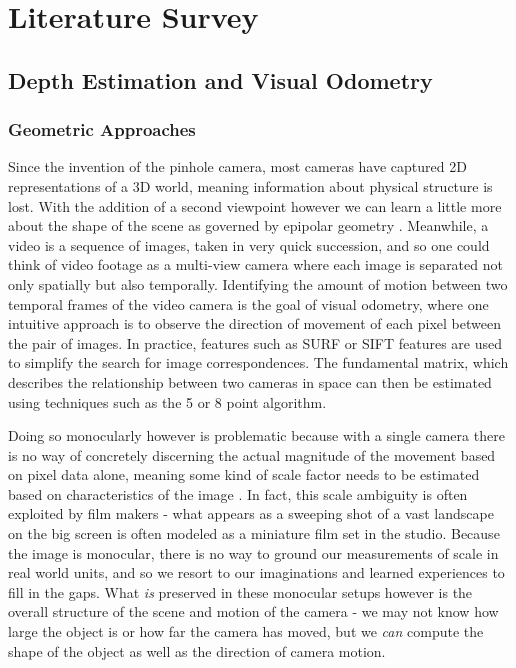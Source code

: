 \documentclass[openany]{book}
\begin{document}
\chapter{Literature Survey}


\section{Depth Estimation and Visual Odometry}


\subsection{Geometric Approaches}

Since the invention of the pinhole camera, most cameras have captured 2D representations of a 3D world, meaning information about physical structure is lost. With the addition of a second viewpoint however we can learn a little more about the shape of the scene as governed by epipolar geometry \cite{zisserman2004multiview}. Meanwhile, a video is a sequence of images, taken in very quick succession, and so one could think of video footage as a multi-view camera where each image is separated not only spatially but also temporally. Identifying the amount of motion between two temporal frames of the video camera is the goal of visual odometry, where one intuitive approach is to observe the direction of movement of each pixel between the pair of images. In practice, features such as SURF \cite{bay2008surf} or SIFT \cite{lowe2004sift} features are used to simplify the search for image correspondences. The fundamental matrix, which describes the relationship between two cameras in space can then be estimated using techniques such as the 5 or 8 point algorithm. 

Doing so monocularly however is problematic because with a single camera there is no way of concretely discerning the actual magnitude of the movement based on pixel data alone, meaning some kind of scale factor needs to be estimated based on characteristics of the image \cite{gakne2018scale, nister2004vo, zhou2016scale, zhou2019scale}. In fact, this scale ambiguity is often exploited by film makers - what appears as a sweeping shot of a vast landscape on the big screen is often modeled as a miniature film set in the studio. Because the image is monocular, there is no way to ground our measurements of scale in real world units, and so we resort to our imaginations and learned experiences to fill in the gaps. What \textit{is} preserved in these monocular setups however is the overall structure of the scene and motion of the camera - we may not know how large the object is or how far the camera has moved, but we \textit{can} compute the  shape of the object as well as the direction of camera motion. 
\end{document}
